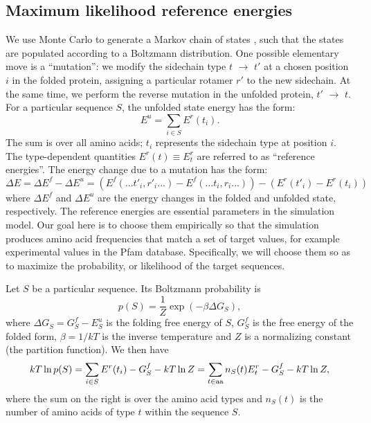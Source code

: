 \documentclass[12pt]{article}
\begin{document}
\subsection{Maximum likelihood reference energies}
We use Monte Carlo to generate a Markov chain of states \cite{FrenkelBK3,GrimmetBK}, such that the states
are populated according to a Boltzmann distribution. One possible elementary move is a ``mutation'': we modify
the sidechain type $t$ $\rightarrow$ $t'$ at a chosen position $i$ in the folded protein, assigning a particular
rotamer $r'$ to the new sidechain. At the same time, we perform the reverse mutation in the unfolded protein,
$t'$ $\rightarrow$ $t$. For a particular sequence $S$, the unfolded state energy has the form:
\begin{equation} \label{eq:unfolded}
E^u = \sum_{i \in S} E^r(t_i).
\end{equation}
The sum is over all amino acids; $t_i$ represents the sidechain type at position $i$.  The type-dependent quantities
$E^r(t) \equiv E^r_t$ are referred to as ``reference energies''. The energy change due to a mutation has the form:
\begin{equation}  \label{eq:deltaE}
\Delta E = \Delta E^f - \Delta E^u =
\left( E^f(... t'_i,r'_i ...) - E^f(... t_i,r_i ...) \right) - \left( E^r(t'_i) - E^r(t_i) \right)
\end{equation}
where $\Delta E^f$ and $\Delta E^u$ are the energy changes in the folded and unfolded state, respectively.
The reference energies are essential parameters in the simulation model. Our goal here is to choose them empirically
so that the simulation produces amino acid frequencies that match a set of target values, for example experimental
values in the Pfam database. Specifically, we will choose them so as to maximize the probability, or likelihood of
the target sequences.

Let $S$ be a particular sequence. Its Boltzmann probability is
\begin{equation}
p(S) = \frac{1}{Z} \exp(-\beta \Delta G_S),
\end{equation}
where $\Delta G_S = G^f_S - E^u_S$ is the folding free energy of $S$, $G^f_S$ is the free energy of the folded form,
$\beta = 1/kT$ is the inverse temperature and $Z$ is a normalizing constant (the partition function). We then have
\begin{equation}
kT \ln p(S) = \sum_{i \in S} E^r(t_i)  - G^f_S - kT \ln Z = \sum_{t \in \rm aa} n_S(t) E^r_t - G^f_S - kT \ln Z,
\end{equation}
where the sum on the right is over the amino acid types and $n_S(t)$ is the number of amino acids of type $t$
within the sequence $S$.
\end{document}
